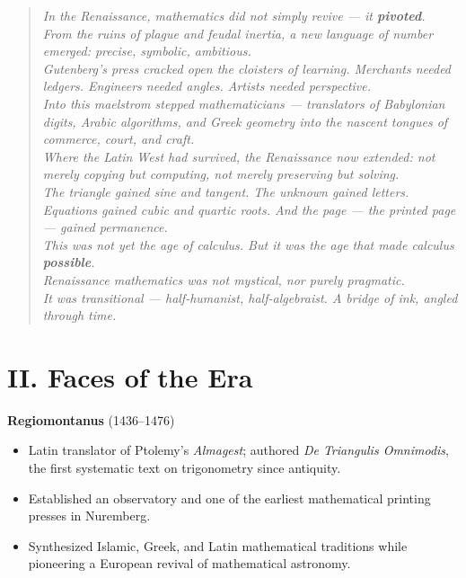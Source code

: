 \documentclass[9pt]{article}
\begin{document}
\begin{quote}
\itshape
In the Renaissance, mathematics did not simply revive --- it \textbf{pivoted}.\\
From the ruins of plague and feudal inertia, a new language of number emerged: precise, symbolic, ambitious.\\

Gutenberg’s press cracked open the cloisters of learning. Merchants needed ledgers. Engineers needed angles. Artists needed perspective.\\
Into this maelstrom stepped mathematicians --- translators of Babylonian digits, Arabic algorithms, and Greek geometry into the nascent tongues of commerce, court, and craft.\\

Where the Latin West had \textit{survived}, the Renaissance now \textit{extended}: not merely copying but computing, not merely preserving but solving.\\
The triangle gained sine and tangent. The unknown gained letters. Equations gained cubic and quartic roots. And the page --- the printed page --- gained permanence.\\

This was not yet the age of calculus. But it was the age that made calculus \textbf{possible}.\\

Renaissance mathematics was not mystical, nor purely pragmatic.\\
It was transitional --- half-humanist, half-algebraist. A bridge of ink, angled through time.
\end{quote}



\newpage



\section*{II. Faces of the Era}

\textbf{Regiomontanus} (1436–1476)

\begin{itemize}
    \item Latin translator of Ptolemy's \textit{Almagest}; authored \textit{De Triangulis Omnimodis}, the first systematic text on trigonometry since antiquity.
    \item Established an observatory and one of the earliest mathematical printing presses in Nuremberg.
    \item Synthesized Islamic, Greek, and Latin mathematical traditions while pioneering a European revival of mathematical astronomy.
\end{itemize}
\end{document}
